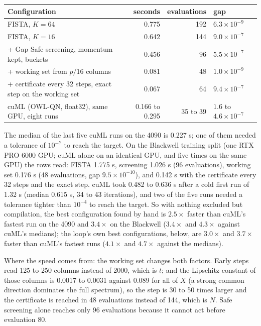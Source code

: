 \begin{center}
\small
\begin{tabular}{lrrl}
\toprule
Configuration & seconds & evaluations & gap \\
\midrule
FISTA, $K=64$ & 0.775 & 192 & $6.3\times10^{-9}$ \\
FISTA, $K=16$ & 0.642 & 144 & $9.0\times10^{-7}$ \\
\quad + Gap Safe screening, momentum kept, buckets & 0.456 & 96 & $5.5\times10^{-7}$ \\
\quad + working set from $p/16$ columns & 0.081 & 48 & $1.0\times10^{-9}$ \\
\quad + certificate every 32 steps, exact step on the working set & 0.067 & 64 & $9.4\times10^{-7}$ \\
cuML (OWL-QN, float32), same GPU, eight runs & 0.166 to 0.295 & 35 to 39 & $1.6$ to $4.6\times10^{-7}$ \\
\bottomrule
\end{tabular}
\end{center}

The median of the last five cuML runs on the 4090 is 0.227 s; one of them
needed a tolerance of $10^{-7}$ to reach the target. On the Blackwell training
split (one RTX PRO 6000 GPU; cuML alone on an identical GPU, and five times on
the same GPU) the rows read: FISTA 1.775 s, screening 1.026 s (96 evaluations),
working set 0.176 s (48 evaluations, gap $9.5\times10^{-10}$), and 0.142 s with
the certificate every 32 steps and the exact step. cuML took 0.482 to 0.636 s
after a cold first run of 1.32 s (median 0.615 s, 34 to 43 iterations), and two
of the five runs needed a tolerance tighter than $10^{-4}$ to reach the target.
So with nothing excluded but compilation, the best configuration found by hand
is $2.5\times$ faster than cuML's fastest run on the 4090 and $3.4\times$ on the
Blackwell ($3.4\times$ and $4.3\times$ against cuML's medians); the loop's own best
configurations, below, are $3.0\times$ and $3.7\times$ faster than cuML's fastest runs
($4.1\times$ and $4.7\times$ against the medians).

Where the speed comes from: the working set changes both factors. Early steps
read 125 to 250 columns instead of 2000, which is $t$; and the Lipschitz
constant of those columns is 0.0017 to 0.0031 against 0.089 for all of $X$ (a
strong common direction dominates the full spectrum), so the step is 30 to 50
times larger and the certificate is reached in 48 evaluations instead of 144,
which is $N$. Safe screening alone reaches only 96 evaluations because it
cannot act before evaluation 80.

